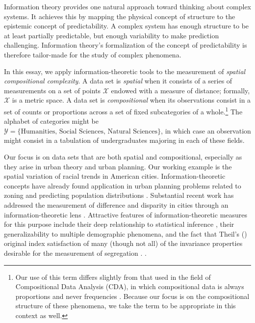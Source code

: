 	Information theory provides one natural approach toward thinking about complex systems. It achieves this by mapping the physical concept of structure to the epistemic concept of predictability. A complex system has enough structure to be at least partially predictable, but enough variability to make prediction challenging. Information theory's formalization of the concept of predictability is therefore tailor-made for the study of complex phenomena. 

	In this essay, we apply information-theoretic tools to the measurement of \emph{spatial compositional complexity}. A data set is \emph{spatial} when it consists of a series of measurements on a set of points $\mathcal{X}$ endowed with a measure of distance; formally, $\mathcal{X}$ is a metric space. A data set is \emph{compositional} when its observations consist in a set of counts or proportions across a set of fixed subcategories of a whole.\footnote{Our use of this term differs slightly from that used in the field of Compositional Data Analysis (CDA), in which compositional data is always proportions and never frequencies \cite{Aitchison1982,Aitchison2002}. Because our focus is on the compositional structure of these phenomena, we take the term to be appropriate in this context as well.} The alphabet of categories might be $\mathcal{Y} = \{\text{Humanities, Social Sciences, Natural Sciences}\}$, in which case an observation might consist in a tabulation of undergraduates majoring in each of these fields. 

	Our focus is on data sets that are both spatial and compositional, especially as they arise in urban theory and urban planning. Our working example is the spatial variation of racial trends in American cities. Information-theoretic concepts have already found application in urban planning problems related to zoning and predicting population distributions \cite{Royal2014,Batty1974,Batty1976,Battya}. Substantial recent work has addressed the measurement of difference and disparity in cities through an information-theoretic lens \cite{Theil1971,Bettencourt2015,Roberto2015a,Roberto2015}. Attractive features of information-theoretic measures for this purpose include their deep relationship to statistical inference \cite{Cover1991,Csiszzr2004}, their generalizability to multiple demographic phenomena, and the fact that Theil's (\cite{Theil1971}) original index satisfaction of many (though not all) of the invariance properties desirable for the measurement of segregation \cite{Reardon2002}. \nocite{Sampson2002,Dietz2002,Wong2004,Keeling1999,Anas1997,Ioannides2004a,Wong1999,Press2009a,Holloway2012,Lee2008,Louf2015,Webber1979,Bivand2014b,Bivand2014a,Bivand2014}.

